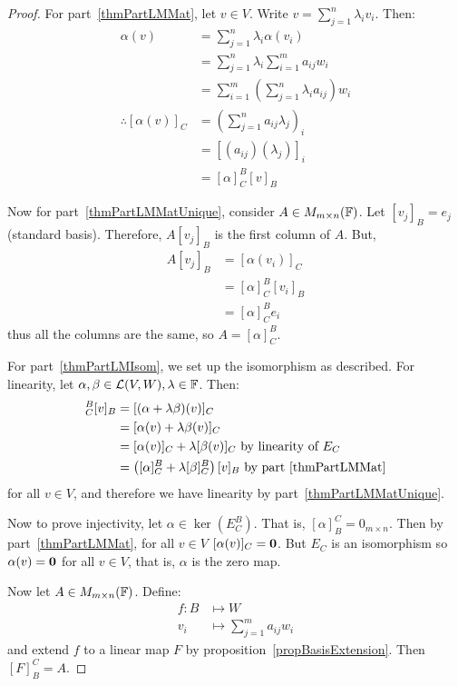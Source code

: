 \documentclass[../Main.tex]{subfiles}
\begin{document}
\begin{proof}
    For part~\ref{thmPartLMMat}, let $v \in V$. Write $v = \sum_{j=1}^n \lambda_i v_i$. Then:
    \begin{align*}
        \alpha(v) &= \sum_{j=1}^{n}\lambda_i \alpha(v_i) \\
        &= \sum_{j=1}^{n}\lambda_i \sum_{i=1}^{m} a_{ij} w_i \\
        &= \sum_{i=1}^{m} \left(\sum_{j=1}^{n}\lambda_i a_{ij}\right)w_i \\
        \therefore [\alpha(v)]_C &= \left(\sum_{j=1}^{n}a_{ij}\lambda_j\right)_i \\
        &= [(a_{ij})(\lambda_j)]_i \\
        &= [\alpha]_C^B [v]_B
    \end{align*}

    Now for part~\ref{thmPartLMMatUnique}, consider $A \in M_{m \times n}(\mathbb{F})$. Let $[v_j]_B = e_j$ (standard basis). Therefore, $A[v_j]_B$ is the first column of $A$. But,
    \begin{align*}
        A[v_j]_B &= [\alpha(v_i)]_C \\
        &= [\alpha]_C^B [v_i]_B \\
        &= [\alpha]_C^B e_i
    \end{align*}
    thus all the columns are the same, so $A = [\alpha]_C^B$.

    For part~\ref{thmPartLMIsom}, we set up the isomorphism as described.
    For linearity, let $\alpha, \beta \in \mathcal{L}(V, W), \lambda \in \mathbb{F}$. Then:
    \begin{align*}
        [\alpha + \lambda\beta]_C^B [v]_B &= [(\alpha + \lambda\beta)(v)]_C \\
        &= [\alpha(v) + \lambda\beta(v)]_C \\
        &= [\alpha(v)]_C + \lambda[\beta(v)]_C \text{ by linearity of } E_C \\
        &= \left([\alpha]_C^B + \lambda[\beta]_C^B\right)[v]_B \text{ by part~\ref{thmPartLMMat}} 
    \end{align*}
    for all $v \in V$, and therefore we have linearity by part~\ref{thmPartLMMatUnique}.

    Now to prove injectivity, let $\alpha \in \ker(E_C^B)$. That is, $[\alpha]_B^C = 0_{m \times n}$. Then by part~\ref{thmPartLMMat}, for all $v \in V$ $[\alpha(v)]_C = \boldsymbol{0}$. But $E_C$ is an isomorphism so $\alpha(v) = \boldsymbol{0}$ for all $v \in V$, that is, $\alpha$ is the zero map.

    Now let $A \in M_{m \times n}(\mathbb{F})$. Define:
    \begin{align*}
        f : B &\mapsto W\\
        v_i &\mapsto \sum_{j=1}^{m}a_{ij}w_i
    \end{align*}
    and extend $f$ to a linear map $F$ by proposition~\ref{propBasisExtension}. Then $[F]_B^C = A$.
\end{proof}
\end{document}
